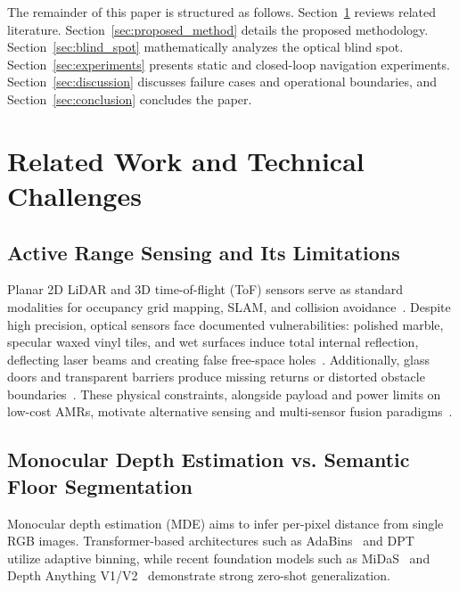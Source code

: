 \documentclass{ieeeaccess}
\begin{document}
The remainder of this paper is structured as follows. Section~\ref{sec:related_work} reviews related literature. Section~\ref{sec:proposed_method} details the proposed methodology. Section~\ref{sec:blind_spot} mathematically analyzes the optical blind spot. Section~\ref{sec:experiments} presents static and closed-loop navigation experiments. Section~\ref{sec:discussion} discusses failure cases and operational boundaries, and Section~\ref{sec:conclusion} concludes the paper.

\section{Related Work and Technical Challenges}
\label{sec:related_work}

\subsection{Active Range Sensing and Its Limitations}
Planar 2D LiDAR and 3D time-of-flight (ToF) sensors serve as standard modalities for occupancy grid mapping, SLAM, and collision avoidance~\cite{li_2020_lidar,thrun_2010_probabilistic,elfes_1989_using}. Despite high precision, optical sensors face documented vulnerabilities: polished marble, specular waxed vinyl tiles, and wet surfaces induce total internal reflection, deflecting laser beams and creating false free-space holes~\cite{deepthadamodaran_2023_experimental,yang_2011_on,zhang2023robust}. Additionally, glass doors and transparent barriers produce missing returns or distorted obstacle boundaries~\cite{tibebu_2021_lidarbased,wang_2017_detecting}. These physical constraints, alongside payload and power limits on low-cost AMRs, motivate alternative sensing and multi-sensor fusion paradigms~\cite{alatise2020review}.

\subsection{Monocular Depth Estimation vs. Semantic Floor Segmentation}
\label{subsec:mde_vs_floor}
Monocular depth estimation (MDE) aims to infer per-pixel distance from single RGB images. Transformer-based architectures such as AdaBins~\cite{shariqfarooqbhat_2021_adabins} and DPT~\cite{ranftl_2021_vision} utilize adaptive binning, while recent foundation models such as MiDaS~\cite{ranftl_2020_towards} and Depth Anything V1/V2~\cite{yang_2024_depth} demonstrate strong zero-shot generalization.
\end{document}

